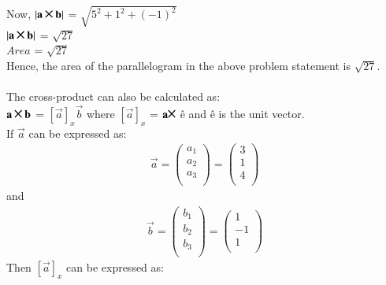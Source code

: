 Now, $\abs{\vec{a} \Cross \vec{b}} $ = $\sqrt{5^2 + 1^2 + (-1)^2}$\\
 $\abs{\vec{a} \Cross \vec{b}} $ = $\sqrt{27}$\\
 $Area$ = $\sqrt{27}$\\
Hence, the area of the parallelogram in the above problem statement is $\sqrt{27}$.\\
\\
The cross-product can also be calculated as:\\
$\vec{a} \Cross \vec{b} $ = $[\vec{a}]_x \vec{b}$
where $[\vec{a}]_x$ = $\vec{a} \Cross $ \^e 
and \^e is the unit vector. \\
If $\vec{a}$ can be expressed as:\\
\begin{equation}
\begin{aligned}
      \vec{a} = \begin{pmatrix}
      a_1 \\ 
      a_2 \\
      a_3 \\
      
    \end{pmatrix} = \begin{pmatrix}
      3 \\ 
      1 \\
      4 \\
      
    \end{pmatrix}
\end{aligned}
\end{equation} and 
\begin{equation}
\begin{aligned}
      \vec{b} = \begin{pmatrix}
      b_1 \\ 
      b_2 \\
      b_3 \\
      
    \end{pmatrix} = \begin{pmatrix}
      1 \\ 
      -1 \\
      1 \\
      
    \end{pmatrix}
\end{aligned}
\end{equation}
Then $[\vec{a}]_x$ can be expressed as:\\
